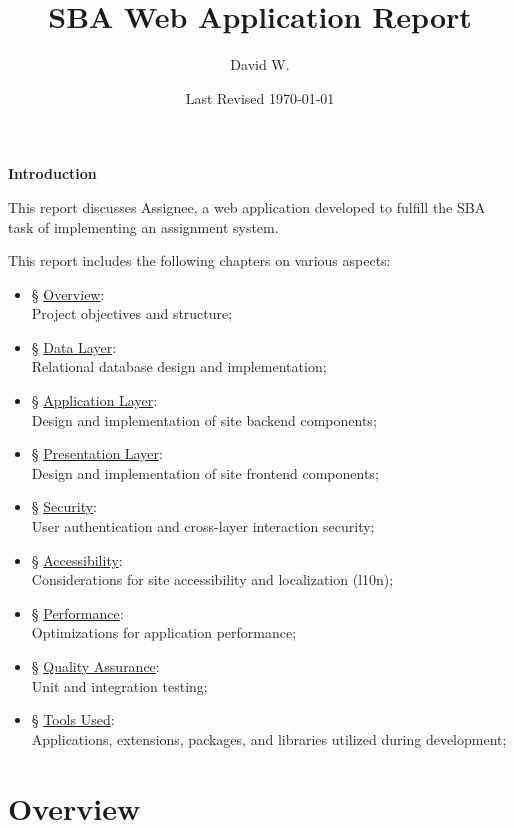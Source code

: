 \documentclass[12pt]{report}
\title{SBA Web Application Report}
\author{David W.}
\date{Last Revised \today}
\newcommand{\n}{\par}
\newcommand{\br}{\n\vspace{1 em}\n}
\begin{document}
\maketitle

\textbf{Introduction}
\br
This report discusses Assignee, a web application developed to fulfill the SBA task of implementing an assignment system.
\br
This report includes the following chapters on various aspects:
\begin{itemize}
	\item \S{} \hyperref[overview]{Overview}:\\
	      Project objectives and structure;
	\item \S{} \hyperref[data-layer]{Data Layer}:\\
	      Relational database design and implementation;
	\item \S{} \hyperref[application-layer]{Application Layer}:\\
	      Design and implementation of site backend components;
	\item \S{} \hyperref[presentation-layer]{Presentation Layer}:\\
	      Design and implementation of site frontend components;
	\item \S{} \hyperref[security]{Security}:\\
	      User authentication and cross-layer interaction security;
	\item \S{} \hyperref[accessibility]{Accessibility}:\\
	      Considerations for site accessibility and localization (l10n);
	\item \S{} \hyperref[performance]{Performance}:\\
	      Optimizations for application performance;
	\item \S{} \hyperref[quality-assurance]{Quality Assurance}:\\
	      Unit and integration testing;
	\item \S{} \hyperref[tools-used]{Tools Used}:\\
	      Applications, extensions, packages, and libraries utilized during development;
\end{itemize}
\tableofcontents




\chapter{Overview} \label{overview}
\end{document}
